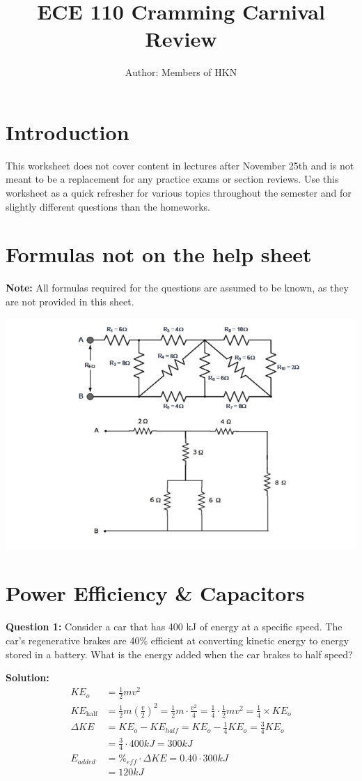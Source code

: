 \documentclass{article}
\begin{document}
\title{ECE 110 Cramming Carnival Review}
\author{Author: Members of HKN}
\date{}
\maketitle

\section*{Introduction}
This worksheet does not cover content in lectures after November 25th and is not meant to be a replacement for any practice exams or section reviews. Use this worksheet as a quick refresher for various topics throughout the semester and for slightly different questions than the homeworks.

\section*{Formulas not on the help sheet}
\textbf{Note:} All formulas required for the questions are assumed to be known, as they are not provided in this sheet.
\begin{center}
    \includegraphics[width=0.75\linewidth]{figures/image.png}
\end{center}
\newpage

\section*{Power Efficiency \& Capacitors}
\textbf{Question 1:} Consider a car that has 400 kJ of energy at a specific speed. The car's regenerative brakes are 40\% efficient at converting kinetic energy to energy stored in a battery. What is the energy added when the car brakes to half speed?

\textbf{Solution:}
\begin{align*}
    KE_{o} &= \frac{1}{2}mv^{2} \\
    KE_{\text{half}} &= \frac{1}{2} m {\left( \frac{v}{2} \right)}^{2}  = \frac{1}{2} m \cdot \frac{v^{2}}{4}  = \frac{1}{4} \cdot \frac{1}{2} m v^{2} =  \frac{1}{4} \times KE_{o} \\
    \Delta KE &= KE_{o} - KE_{half} = KE_{o} - \frac{1}{4}KE_{o} = \frac{3}{4}KE_{o} \\
    &= \frac{3}{4} \cdot 400kJ = 300 kJ \\
    E_{added} &= \%_{eff} \cdot \Delta KE = 0.40 \cdot 300kJ \\
    &= \boxed{120kJ}
\end{align*}
\end{document}

